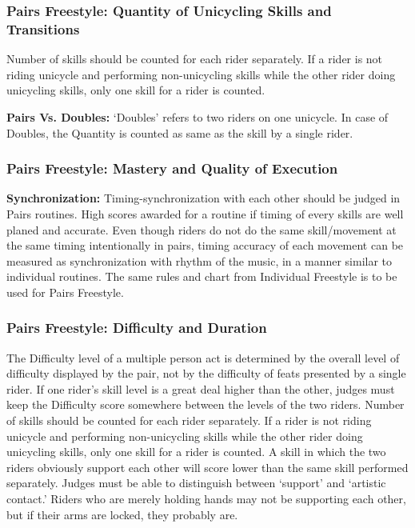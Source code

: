 \subsubsection{Pairs Freestyle: Quantity of Unicycling Skills and Transitions \label{subsec:freestyle_pairs-additional-judging-criteria_quantity}}

Number of skills should be counted for each rider separately.
If a rider is not riding unicycle and performing non-unicycling skills while the other rider doing unicycling skills, only one skill for a rider is counted.

\textbf{Pairs Vs. Doubles:} `Doubles' refers to two riders on one unicycle.
In case of Doubles, the Quantity is counted as same as the skill by a single rider.

\subsubsection{Pairs Freestyle: Mastery and Quality of Execution}

\textbf{Synchronization:} Timing-synchronization with each other should be judged in Pairs routines.
High scores awarded for a routine if timing of every skills are well planed and accurate.
Even though riders do not do the same skill/movement at the same timing intentionally in pairs, timing accuracy of each movement can be measured as synchronization with rhythm of the music, in a manner similar to individual routines.
The same rules and chart from Individual Freestyle is to be used for Pairs Freestyle.

\subsubsection{Pairs Freestyle: Difficulty and Duration \label{subsec:freestyle_pairs-additional-judging-criteria_difficulty-duration}}

The Difficulty level of a multiple person act is determined by the overall level of difficulty displayed by the pair, not by the difficulty of feats presented by a single rider.
If one rider's skill level is a great deal higher than the other, judges must keep the Difficulty score somewhere between the levels of the two riders.
Number of skills should be counted for each rider separately.
If a rider is not riding unicycle and performing non-unicycling skills while the other rider doing unicycling skills, only one skill for a rider is counted.
A skill in which the two riders obviously support each other will score lower than the same skill performed separately.
Judges must be able to distinguish between `support' and `artistic contact.' Riders who are merely holding hands may not be supporting each other, but if their arms are locked, they probably are.


